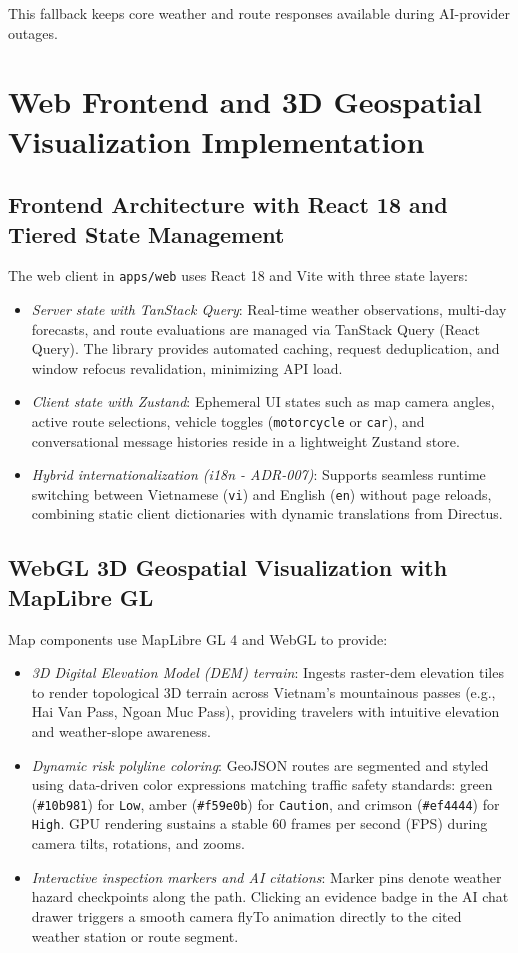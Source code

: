 This fallback keeps core weather and route responses available during AI-provider outages.

\section{Web Frontend and 3D Geospatial Visualization Implementation}
\label{sec:frontend_web_impl}

\subsection{Frontend Architecture with React 18 and Tiered State Management}
The web client in \texttt{apps/web} uses React 18 and Vite with three state layers:
\begin{itemize}
    \item[-] \textit{Server state with TanStack Query}: Real-time weather observations, multi-day forecasts, and route evaluations are managed via TanStack Query (React Query). The library provides automated caching, request deduplication, and window refocus revalidation, minimizing API load.
    \item[-] \textit{Client state with Zustand}: Ephemeral UI states such as map camera angles, active route selections, vehicle toggles (\texttt{motorcycle} or \texttt{car}), and conversational message histories reside in a lightweight Zustand store.
    \item[-] \textit{Hybrid internationalization (i18n - ADR-007)}: Supports seamless runtime switching between Vietnamese (\texttt{vi}) and English (\texttt{en}) without page reloads, combining static client dictionaries with dynamic translations from Directus.
\end{itemize}

\subsection{WebGL 3D Geospatial Visualization with MapLibre GL}
Map components use MapLibre GL 4 and WebGL to provide:
\begin{itemize}
    \item[-] \textit{3D Digital Elevation Model (DEM) terrain}: Ingests raster-dem elevation tiles to render topological 3D terrain across Vietnam's mountainous passes (e.g., Hai Van Pass, Ngoan Muc Pass), providing travelers with intuitive elevation and weather-slope awareness.
    \item[-] \textit{Dynamic risk polyline coloring}: GeoJSON routes are segmented and styled using data-driven color expressions matching traffic safety standards: green (\texttt{\#10b981}) for \texttt{Low}, amber (\texttt{\#f59e0b}) for \texttt{Caution}, and crimson (\texttt{\#ef4444}) for \texttt{High}. GPU rendering sustains a stable 60 frames per second (FPS) during camera tilts, rotations, and zooms.
    \item[-] \textit{Interactive inspection markers and AI citations}: Marker pins denote weather hazard checkpoints along the path. Clicking an evidence badge in the AI chat drawer triggers a smooth camera flyTo animation directly to the cited weather station or route segment.
\end{itemize}

